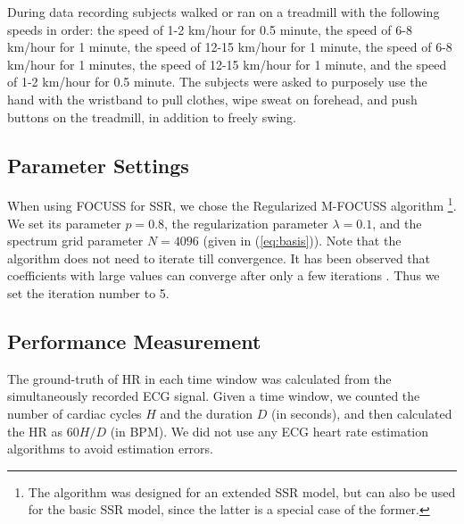 \documentclass[10pt,twocolumn]{IEEEtran}
\begin{document}
During data recording subjects walked or ran on a treadmill with the following speeds in order: the speed of 1-2 km/hour for 0.5 minute, the speed of 6-8 km/hour for 1 minute, the speed of 12-15 km/hour for 1 minute, the speed of 6-8 km/hour for 1 minutes, the speed of 12-15 km/hour for 1 minute, and the speed of 1-2 km/hour for 0.5 minute. The subjects were asked to purposely use the hand with the wristband to pull clothes, wipe sweat on forehead, and push buttons on the treadmill, in addition to freely swing.


\subsection{Parameter Settings}


When using FOCUSS for SSR, we chose the Regularized M-FOCUSS algorithm \cite{cotter2005sparse} \footnote{The algorithm was designed for an extended SSR model, but can also be used for the basic SSR model, since the latter is a special case of the former.}. We set its parameter $p=0.8$, the regularization parameter $\lambda = 0.1$, and the spectrum grid parameter $N = 4096$ (given in (\ref{eq:basis})). Note that the algorithm does not need to iterate till convergence. It has been observed that coefficients with large values can converge after only a few iterations \cite{Gorodnitsky1997}. Thus we set the iteration number to 5.






\subsection{Performance Measurement}
\label{subsec:performance}

The ground-truth of HR in each time window was calculated from the simultaneously recorded ECG signal. Given a time window, we counted the number of cardiac cycles $H$ and the duration $D$ (in seconds), and then calculated the HR as $60 H/D$ (in BPM). We did not use any ECG heart rate estimation algorithms to avoid  estimation errors.
\end{document}
